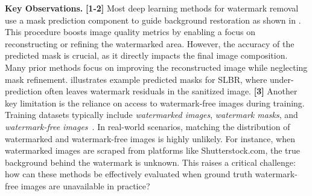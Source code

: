 \textbf{Key Observations.} \textbf{[1-2]} Most deep learning methods for watermark removal use a mask prediction component to guide background restoration as shown in . This procedure boosts image quality metrics by enabling a focus on reconstructing or refining the watermarked area. However, the accuracy of the predicted mask is crucial, as it directly impacts the final image composition. Many prior methods focus on improving the reconstructed image while neglecting mask refinement.  illustrates example predicted masks for SLBR, where under-prediction often leaves watermark residuals in the sanitized image. \textbf{[3]} Another key limitation is the reliance on access to watermark-free images during training. Training datasets typically include \textit{watermarked images}, \textit{watermark masks}, and \textit{watermark-free images}~\cite{liu2021wdnet,cun2021split,cheng2018large}. In real-world scenarios, matching the distribution of watermarked and watermark-free images is highly unlikely. For instance, when watermarked images are scraped from platforms like Shutterstock.com, the true background behind the watermark is unknown. This raises a critical challenge: how can these methods be effectively evaluated when ground truth watermark-free images are unavailable in practice?





